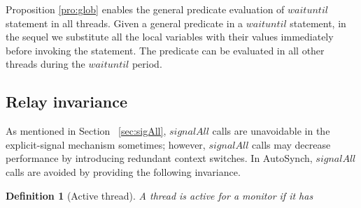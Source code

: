 \documentclass[preprint]{sigplanconf}
\newtheorem{definition}{Definition}
\begin{document}
Proposition \ref{pro:glob} enables the general predicate evaluation of
$waituntil$ statement in all threads. 
Given a general predicate in a $waituntil$ statement, in the sequel we substitute
all the local variables with their values immediately before invoking the
statement. The predicate can be evaluated in all other threads during the
$waituntil$ period. 

\subsection{Relay invariance} \label{sec:relay}
As mentioned in Section ~\ref{sec:sigAll}, $signalAll$ calls are unavoidable in
the explicit-signal mechanism sometimes; however, $signalAll$ calls may decrease
performance by introducing redundant context switches. 
In
AutoSynch, $signalAll$ calls are avoided by providing the following invariance. 

\begin{definition}[Active thread] 
    A thread is active for a monitor if it has 
\end{definition}
\end{document}
